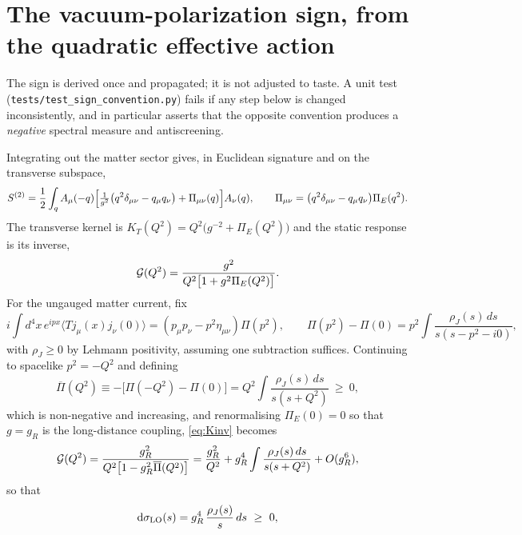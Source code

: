 \appendix

\section{The vacuum-polarization sign, from the quadratic effective action}
\label{app:sign}

The sign is derived once and propagated; it is not adjusted to taste. A unit
test (\nolinkurl{tests/test_sign_convention.py}) fails if any step below is
changed inconsistently, and in particular asserts that the opposite convention
produces a \emph{negative} spectral measure and antiscreening.

Integrating out the matter sector gives, in Euclidean signature and on the
transverse subspace,
\begin{equation}
S^{(2)}=\frac12\int_{q}A_{\mu}(-q)
\Bigl[\tfrac{1}{g^{2}}\bigl(q^{2}\delta_{\mu\nu}-q_{\mu}q_{\nu}\bigr)
+\Pi_{\mu\nu}(q)\Bigr]A_{\nu}(q),
\qquad
\Pi_{\mu\nu}=\bigl(q^{2}\delta_{\mu\nu}-q_{\mu}q_{\nu}\bigr)\Pi_{E}(q^{2}).
\end{equation}
The transverse kernel is $K_{T}(Q^{2})=Q^{2}\bigl(g^{-2}+\Pi_{E}(Q^{2})\bigr)$
and the static response is its inverse,
\begin{equation}
\mathcal{G}(Q^{2})=\frac{g^{2}}{Q^{2}\bigl[1+g^{2}\Pi_{E}(Q^{2})\bigr]}.
\label{eq:Kinv}
\end{equation}
For the ungauged matter current, fix
\begin{equation}
i\!\int\! d^{4}x\,e^{ipx}\langle T j_{\mu}(x)j_{\nu}(0)\rangle
=(p_{\mu}p_{\nu}-p^{2}\eta_{\mu\nu})\Pi(p^{2}),
\qquad
\Pi(p^{2})-\Pi(0)=p^{2}\!\int\!\frac{\rho_{J}(s)\,ds}{s(s-p^{2}-i0)},
\end{equation}
with $\rho_{J}\ge0$ by Lehmann positivity, assuming one subtraction suffices.
Continuing to spacelike $p^{2}=-Q^{2}$ and defining
\begin{equation}
\overline{\Pi}(Q^{2})\equiv-\bigl[\Pi(-Q^{2})-\Pi(0)\bigr]
=Q^{2}\int\frac{\rho_{J}(s)\,ds}{s(s+Q^{2})}\ \ge\ 0,
\end{equation}
which is non-negative and increasing, and renormalising $\Pi_{E}(0)=0$ so that
$g=g_{R}$ is the long-distance coupling, \eqref{eq:Kinv} becomes
\begin{equation}
\mathcal{G}(Q^{2})=\frac{g_{R}^{2}}{Q^{2}\bigl[1-g_{R}^{2}\overline{\Pi}(Q^{2})\bigr]}
=\frac{g_{R}^{2}}{Q^{2}}
+g_{R}^{4}\int\frac{\rho_{J}(s)\,ds}{s(s+Q^{2})}+O(g_{R}^{6}),
\label{eq:expansion}
\end{equation}
so that
\begin{equation}
\dsig_{\mathrm{LO}}(s)=g_{R}^{4}\,\frac{\rho_{J}(s)}{s}\,ds\ \ge\ 0 ,
\end{equation}
